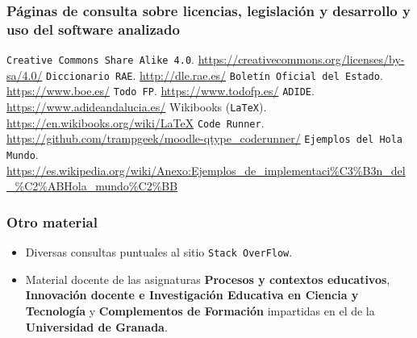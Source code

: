 

\printbibliography[heading=bibempty]

\bigskip
\subsubsection*{Páginas de consulta sobre licencias, legislación y desarrollo y uso del software analizado}
 {\tt Creative Commons Share Alike 4.0}. \url{https://creativecommons.org/licenses/by-sa/4.0/}
 {\tt Diccionario RAE}. \url{http://dle.rae.es/}
 {\tt Boletín Oficial del Estado}. \url{https://www.boe.es/}
 {\tt Todo FP}. \url{https://www.todofp.es/}
 {\tt ADIDE}. \url{https://www.adideandalucia.es/}
 Wikibooks ({\tt LaTeX}). \url{https://en.wikibooks.org/wiki/LaTeX}
 {\tt Code Runner}. \url{https://github.com/trampgeek/moodle-qtype_coderunner/}
 {\tt Ejemplos del Hola Mundo}. \url{https://es.wikipedia.org/wiki/Anexo:Ejemplos_de_implementaci%C3%B3n_del_%C2%ABHola_mundo%C2%BB}
\bigskip
\subsubsection*{Otro material}
\begin{itemize}
	\item Diversas consultas puntuales al sitio {\tt Stack OverFlow}.
	\item Material docente de las asignaturas \textbf{Procesos y contextos educativos}, \textbf{Innovación docente e Investigación Educativa en Ciencia y Tecnología} y \textbf{Complementos de Formación} impartidas en el \master de la \textbf{Universidad de Granada}.
\end{itemize}